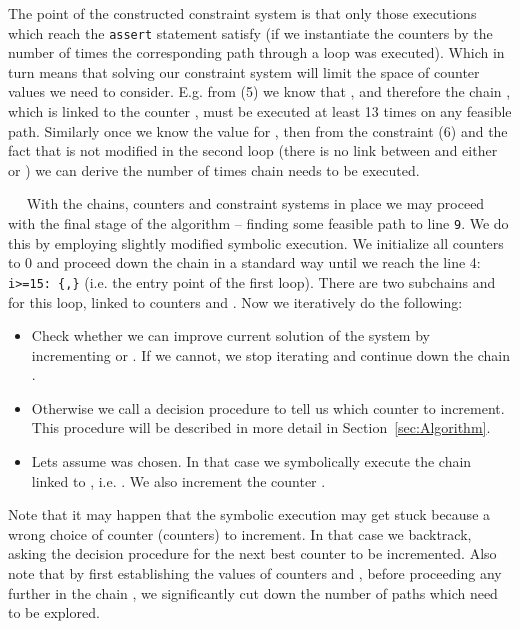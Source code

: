 \documentclass{llncs}
\newenvironment{mitemize}{\vspace{-1\baselineskip}\begin{itemize}
\setlength{\itemsep}{0pt}}{\end{itemize}}
\renewcommand{\paragraph}[1]{\vspace{0.2cm}\noindent{\bf #1}~~}
\begin{document}
The point of the constructed constraint system  is that
only those executions which reach the \texttt{assert} statement satisfy
 (if we instantiate the counters by the number of times
the corresponding path through a loop was executed). Which in turn means
that solving our constraint system will limit the space of counter values we
need to consider. E.g. from (5) we know that ,
and therefore the chain , which is linked to the counter , must be executed at least
13 times on any feasible path. Similarly once we know the value for
, then  from the constraint (6) and the
fact that  is not modified in the second loop (there is no link
between  and either  or ) we
can derive the number of times chain  needs to be executed.

\paragraph{Phase 3: Navigating the symbolic execution}
With the chains, counters and constraint systems in place we may proceed
with the final stage of the algorithm -- finding some feasible path to line
\texttt{9}. We do this by employing slightly modified symbolic execution. We
initialize all counters to 0 and proceed down the chain  in a standard
way until we reach the line 4: \texttt{i>=15: \{,\}}
(i.e. the entry point of the first loop). There are two subchains  and 
for this loop, linked to counters  and .
Now we iteratively do the following:
\medskip

\begin{mitemize}
\item Check whether we can improve current solution of the system
  by incrementing  or . If we cannot, we stop iterating
  and continue down the chain .
\item Otherwise we call a decision procedure to tell us which counter to
  increment. This procedure will be described in more detail in Section~\ref{sec:Algorithm}.
\item Lets assume  was chosen. In that case we symbolically
execute the chain linked to , i.e. . We also increment the
counter .
\end{mitemize}

\noindent
Note that it may happen that the symbolic execution may get stuck because a
wrong choice of counter (counters) to increment. In
that case we backtrack, asking the decision procedure for the next best
counter to be incremented. Also note that by first establishing the values of
counters  and , before proceeding any further in the
chain , we
significantly cut down the number of paths which need to be explored.
\end{document}
